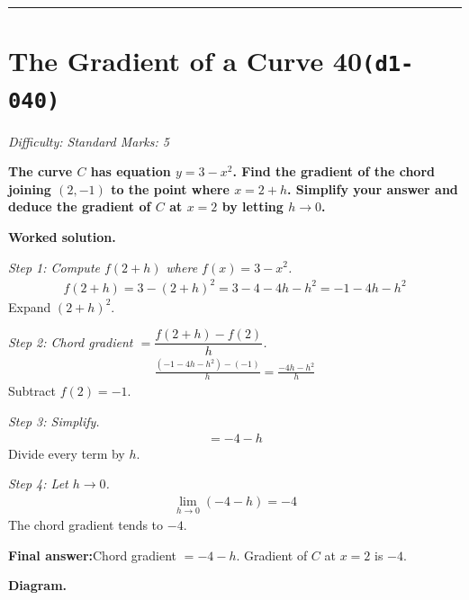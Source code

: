\documentclass[11pt]{article}
\newcommand{\question}[1]{\par\medskip\noindent\textbf{#1}\par}
\begin{document}
\medskip\hrule

\section*{The Gradient of a Curve 40\quad\small\texttt{(d1-040)}}
\textit{Difficulty: Standard \quad\textbar\quad Marks: 5}

\question{The curve \( C \) has equation \( y = 3 - x^2 \). Find the gradient of the chord joining \( (2, -1) \) to the point where \( x = 2 + h \). Simplify your answer and deduce the gradient of \( C \) at \( x = 2 \) by letting \( h \to 0 \).}

\textbf{Worked solution.}

\textit{Step 1: Compute \( f(2+h) \) where \( f(x) = 3 - x^2 \).}
\[\begin{gathered}
f(2+h) = 3 - (2+h)^2 = 3 - 4 - 4h - h^2 = -1 - 4h - h^2
\end{gathered}\]
Expand \( (2+h)^2 \).

\textit{Step 2: Chord gradient \( = \dfrac{f(2+h) - f(2)}{h} \).}
\[\begin{gathered}
\frac{(-1 - 4h - h^2) - (-1)}{h} = \frac{-4h - h^2}{h}
\end{gathered}\]
Subtract \( f(2) = -1 \).

\textit{Step 3: Simplify.}
\[\begin{gathered}
= -4 - h
\end{gathered}\]
Divide every term by \( h \).

\textit{Step 4: Let \( h \to 0 \).}
\[\begin{gathered}
\lim_{h \to 0}(-4 - h) = -4
\end{gathered}\]
The chord gradient tends to \( -4 \).

\begin{answerbox}
\textbf{Final answer:}\quad Chord gradient \(\displaystyle  = -4 - h \). Gradient of \(\displaystyle  C \) at \(\displaystyle  x = 2 \) is \(\displaystyle  -4 \).
\end{answerbox}
\textbf{Diagram.}
\end{document}
